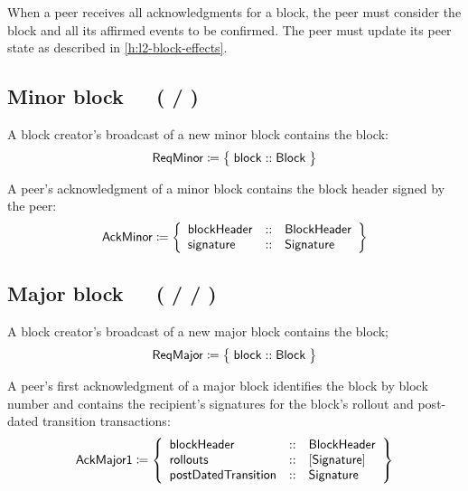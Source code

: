 \documentclass[../hydrozoa.tex]{subfiles}
\begin{document}
When a peer receives all acknowledgments for a block, the peer must consider the block and all its affirmed events to be confirmed.
The peer must update its peer state as described in \cref{h:l2-block-effects}.

\subsection{Minor block~~~( / )}%
\label{h:l2-consensus-minor-block}%

A block creator's broadcast of a new minor block contains the block:
\begin{equation*}
  \mathsf{ReqMinor} \coloneq \;\bigr\{\; \mathsf{block} :: \mathsf{Block} \;\bigr\}
\end{equation*}

A peer's acknowledgment of a minor block contains the block header signed by the peer:
\begin{equation*}
  \mathsf{AckMinor} \coloneq \left\{
  \begin{array}{lll}
    \mathsf{blockHeader} &::& \mathsf{BlockHeader} \\
    \mathsf{signature} &::& \mathsf{Signature}
  \end{array}\right\}
\end{equation*}

\subsection{Major block~~~( /  / )}%
\label{h:l2-consensus-major-block}%

A block creator's broadcast of a new major block contains the block;
\begin{equation*}
  \mathsf{ReqMajor} \coloneq \;\bigr\{\; \mathsf{block} :: \mathsf{Block} \;\bigr\}
\end{equation*}

A peer's first acknowledgment of a major block identifies the block by block number and contains the recipient's signatures for the block's rollout and post-dated transition transactions:
\begin{equation*}
  \mathsf{AckMajor1} \coloneq \left\{
  \begin{array}{lll}
    \mathsf{blockHeader} &::& \mathsf{BlockHeader} \\
    \mathsf{rollouts} &::& [\mathsf{Signature}] \\
    \mathsf{postDatedTransition} &::& \mathsf{Signature}
  \end{array}\right\}
\end{equation*}
\end{document}
